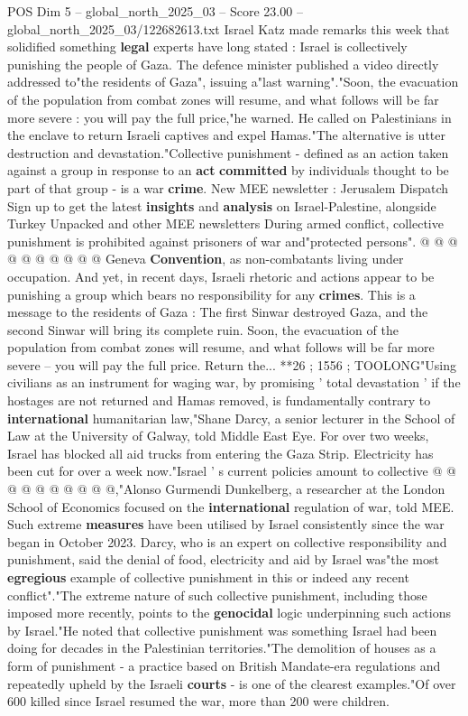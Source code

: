 \begin{textsample}{POS Dim 5 – global\_north\_2025\_03 – Score 23.00 – global\_north\_2025\_03/122682613.txt}  \label{ex:f5_pos_151}
Israel Katz made remarks this week that solidified something \textbf{legal} experts have long stated : Israel is collectively punishing the people of Gaza.
The defence minister published a video directly addressed to"the residents of Gaza", issuing a"last warning"."Soon, the evacuation of the population from combat zones will resume, and what follows will be far more severe : you will pay the full price,"he warned.
He called on Palestinians in the enclave to return Israeli captives and expel Hamas."The alternative is utter destruction and devastation."Collective punishment - defined as an action taken against a group in response to an \textbf{act} \textbf{committed} by individuals thought to be part of that group - is a war \textbf{crime}.
New MEE newsletter : Jerusalem Dispatch Sign up to get the latest \textbf{insights} and \textbf{analysis} on Israel-Palestine, alongside Turkey Unpacked and other MEE newsletters During armed conflict, collective punishment is prohibited against prisoners of war and"protected persons". @ @ @ @ @ @ @ @ @ @ Geneva \textbf{Convention}, as non-combatants living under occupation.
And yet, in recent days, Israeli rhetoric and actions appear to be punishing a group which bears no responsibility for any \textbf{crimes}.
This is a message to the residents of Gaza : The first Sinwar destroyed Gaza, and the second Sinwar will bring its complete ruin.
Soon, the evacuation of the population from combat zones will resume, and what follows will be far more severe -- you will pay the full price.
Return the... **26 ; 1556 ; TOOLONG"Using civilians as an instrument for waging war, by promising ' total devastation ' if the hostages are not returned and Hamas removed, is fundamentally contrary to \textbf{international} humanitarian law,"Shane Darcy, a senior lecturer in the School of Law at the University of Galway, told Middle East Eye.
For over two weeks, Israel has blocked all aid trucks from entering the Gaza Strip.
Electricity has been cut for over a week now."Israel ' s current policies amount to collective @ @ @ @ @ @ @ @ @ @,"Alonso Gurmendi Dunkelberg, a researcher at the London School of Economics focused on the \textbf{international} regulation of war, told MEE.
Such extreme \textbf{measures} have been utilised by Israel consistently since the war began in October 2023.
Darcy, who is an expert on collective responsibility and punishment, said the denial of food, electricity and aid by Israel was"the most \textbf{egregious} example of collective punishment in this or indeed any recent conflict"."The extreme nature of such collective punishment, including those imposed more recently, points to the \textbf{genocidal} logic underpinning such actions by Israel."He noted that collective punishment was something Israel had been doing for decades in the Palestinian territories."The demolition of houses as a form of punishment - a practice based on British Mandate-era regulations and repeatedly upheld by the Israeli \textbf{courts} - is one of the clearest examples."Of over 600 killed since Israel resumed the war, more than 200 were children.

\end{textsample}
